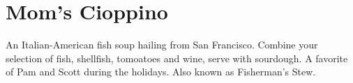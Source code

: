 \section[Cioppino]{Mom's Cioppino}

\begin{recipestats}[
        servings=6,
        preptime=45 \minute,
        bakingtime=1 \hour,
        source=Pamela Teresi,
    ]
\end{recipestats}

\begin{recipeabstract}
    An Italian-American fish soup hailing from San Francisco.
    Combine your selection of fish, shellfish, tomoatoes and wine, serve with sourdough.
    A favorite of Pam and Scott during the holidays.
    Also known as Fisherman's Stew.
\end{recipeabstract}

\begin{ingredientcolumns}
    \begin{ingredientblock}
        \\
        \\
        \\
        \\
        \\
        \\
        \\
        \\
        \\
    \end{ingredientblock}
    \begin{ingredientblock}
        \\
        \\
        \\
        \\
        \\
        \\
        \\
        \\
        \\
    \end{ingredientblock}
\end{ingredientcolumns}

